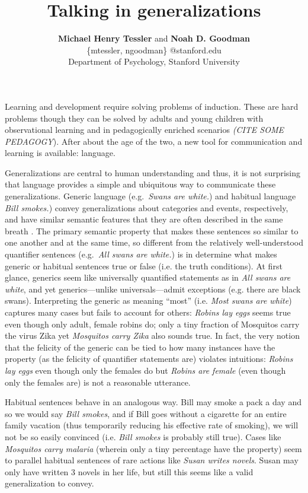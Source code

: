\documentclass[11pt,letterpaper]{article}
\title{Talking in generalizations}
\author{{\large \bf Michael Henry Tessler} and {\large \bf Noah D. Goodman} \\
\{mtessler, ngoodman\} @stanford.edu\\
  Department of Psychology, Stanford University}
\begin{document}
\maketitle

Learning and development require solving problems of induction.
These are hard problems though they can be solved by adults and young children with observational learning \cite{Markman1989} 
and in pedagogically enriched scenarios \emph{(CITE SOME PEDAGOGY}).
After about the age of the two, a new tool for communication and learning is available: language.

Generalizations are central to human understanding and thus, it is not surprising that language provides a simple and ubiquitous way to communicate these generalizations. 
Generic language (e.g.~\emph{Swans are white.}) and habitual language \emph{Bill smokes.}) convey generalizations about categories and events, respectively, and have similar semantic features that they are often described in the same breath \cite{Carlson1977, Carlson2005, Cohen1999}.
The primary semantic property that makes these sentences so similar to one another and at the same time, so different from the relatively well-understood quantifier sentences (e.g.~\emph{All swans are white.}) is in determine what makes generic or habitual sentences true or false (i.e. the truth conditions).
At first glance, generics seem like universally quantified statements as in \emph{All swans are white}, and yet generics---unlike universals---admit exceptions (e.g. there are black swans). 
Interpreting the generic as meaning ``most'' (i.e. \emph{Most swans are white}) captures many cases but fails to account for others: \emph{Robins lay eggs} seems true even though only adult, female robins do; only a tiny fraction of Mosquitos carry the virus Zika yet \emph{Mosquitos carry Zika} also sounds true. 
In fact, the very notion that the felicity of the generic can be tied to how many instances have the property (as the felicity of quantifier statements are) violates intuitions: \emph{Robins lay eggs} even though only the females do but \emph{Robins are female} (even though only the females are) is not a reasonable utterance.

Habitual sentences behave in an analogous way. 
Bill may smoke a pack a day and so we would say \emph{Bill smokes}, and if Bill goes without a cigarette for an entire family vacation (thus temporarily reducing his effective rate of smoking), we will not be so easily convinced (i.e. \emph{Bill smokes} is probably still true).
Cases like \emph{Mosquitos carry malaria} (wherein only a tiny percentage have the property) seem to parallel habitual sentences of rare actions like \emph{Susan writes novels}. Susan may only have written 3 novels in her life, but still this seems like a valid generalization to convey.
\end{document}
